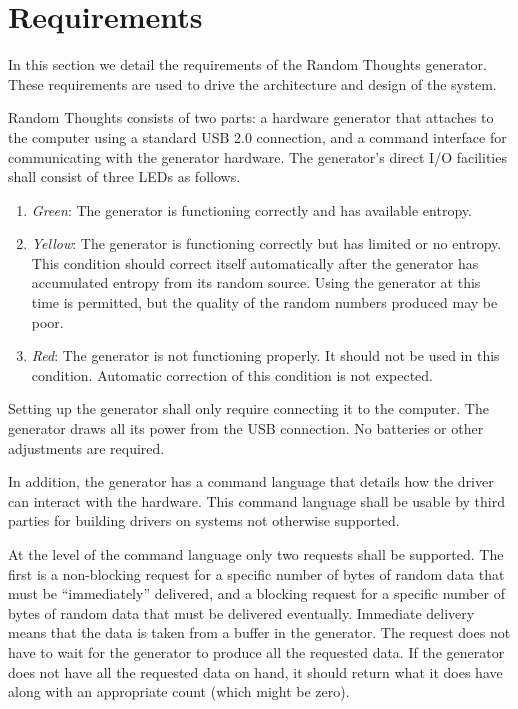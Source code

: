 
\chapter{Requirements}
\label{chapt:requirements}

In this section we detail the requirements of the Random Thoughts generator. These requirements
are used to drive the architecture and design of the system.

Random Thoughts consists of two parts: a hardware generator that attaches to the computer using
a standard USB 2.0 connection, and a command interface for communicating with the generator
hardware. The generator's direct I/O facilities shall consist of three LEDs as follows.

\begin{enumerate}
\item \textit{Green}: The generator is functioning correctly and has available entropy.

\item \textit{Yellow}: The generator is functioning correctly but has limited or no entropy.
  This condition should correct itself automatically after the generator has accumulated entropy
  from its random source. Using the generator at this time is permitted, but the quality of the
  random numbers produced may be poor.

\item \textit{Red}: The generator is not functioning properly. It should not be used in this
  condition. Automatic correction of this condition is not expected.
\end{enumerate}

Setting up the generator shall only require connecting it to the computer. The generator draws
all its power from the USB connection. No batteries or other adjustments are required.

In addition, the generator has a command language that details how the driver can interact with
the hardware. This command language shall be usable by third parties for building drivers on
systems not otherwise supported.

At the level of the command language only two requests shall be supported. The first is a
non-blocking request for a specific number of bytes of random data that must be ``immediately''
delivered, and a blocking request for a specific number of bytes of random data that must be
delivered eventually. Immediate delivery means that the data is taken from a buffer in the
generator. The request does not have to wait for the generator to produce all the requested
data. If the generator does not have all the requested data on hand, it should return what it
does have along with an appropriate count (which might be zero).

